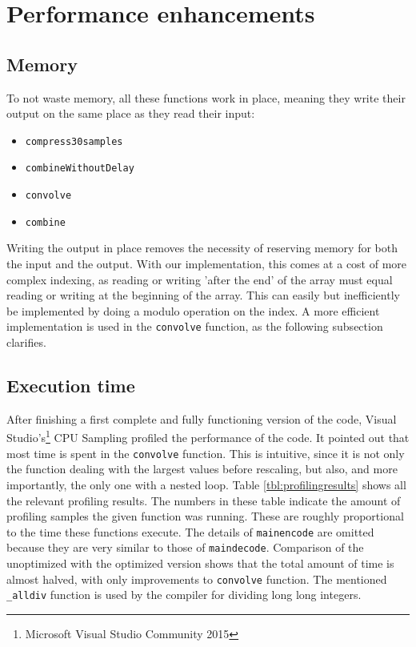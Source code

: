 \documentclass[a4paper]{article}
\begin{document}
\section{Performance enhancements}\label{sec:performance}
\subsection{Memory}
To not waste memory, all these functions work in place, meaning they write their output on the same place as they read their input:
\begin{itemize}[noitemsep]
\item \texttt{compress30samples}
\item \texttt{combineWithoutDelay}
\item \texttt{convolve}
\item \texttt{combine}
\end{itemize}
Writing the output in place removes the necessity of reserving memory for both the input and the output. With our implementation, this comes at a cost of more complex indexing, as reading or writing 'after the end' of the array must equal reading or writing at the beginning of the array. This can easily but inefficiently be implemented by doing a modulo operation on the index. A more efficient implementation is used in the \texttt{convolve} function, as the following subsection clarifies.
\subsection{Execution time}\label{sec:processing}
After finishing a first complete and fully functioning version of the code, Visual Studio's\footnote{Microsoft Visual Studio Community 2015} CPU Sampling profiled the performance of the code. It pointed out that most time is spent in the \texttt{convolve} function. This is intuitive, since it is not only the function dealing with the largest values before rescaling, but also, and more importantly, the only one with a nested loop. Table \ref{tbl:profilingresults} shows all the relevant profiling results. The numbers in these table indicate the amount of profiling samples the given function was running. These are roughly proportional to the time these functions execute. The details of \texttt{mainencode} are omitted because they are very similar to those of \texttt{maindecode}. Comparison of the unoptimized with the optimized version shows that the total amount of time is almost halved, with only improvements to \texttt{convolve} function. The mentioned \texttt{\_alldiv} function is used by the compiler for dividing long long integers.\\
\end{document}

